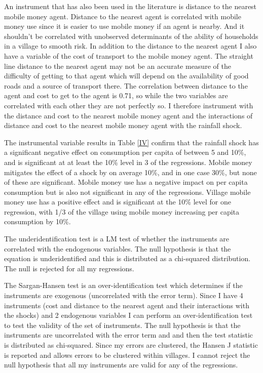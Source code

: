 An instrument that has also been used in the literature is distance to the nearest mobile money agent. Distance to the nearest agent is correlated with mobile money use since it is easier to use mobile money if an agent is nearby. And it shouldn't be correlated with unobserved determinants of the ability of households in a village to smooth risk. In addition to the distance to the nearest agent I also have a variable of the cost of transport to the mobile money agent. The straight line distance to the nearest agent may not be an accurate measure of the difficulty of getting to that agent which will depend on the availability of good roads and a source of transport there. The correlation between distance to the agent and cost to get to the agent is 0.71, so while the two variables are correlated with each other they are not perfectly so. I therefore instrument with the distance and cost to the nearest mobile money agent and the interactions of distance and cost to the nearest mobile money agent with the rainfall shock. 



The instrumental variable results in Table \ref{IV} confirm that the rainfall shock has a significant negative effect on consumption per capita of between 5 and 10\%, and is significant at at least the 10\% level in 3 of the regressions. Mobile money mitigates the effect of a shock by on average 10\%, and in one case 30\%, but none of these are significant. Mobile money use has a negative impact on per capita consumption  but is also not significant in any of the regressions. Village mobile money use has a positive effect and is significant at the 10\% level for one regression, with 1/3 of the village using mobile money increasing per capita consumption by 10\%. 


The underidentification test is a LM test of whether the instruments are correlated with the endogenous variables. The null hypothesis is that the equation is underidentified and this is distributed as a chi-squared distribution. The null is rejected for all my regressions. 

The Sargan-Hansen test is an over-identification test which determines if the instruments are exogenous (uncorrelated with the error term). Since I have 4 instruments (cost and distance to the nearest agent and their interactions with the shocks) and 2 endogenous variables I can perform an over-identification test to test the validity of the set of instruments. The null hypothesis is that the instruments are uncorrelated with the error term and and then the test statistic is distributed as chi-squared. Since my errors are clustered, the Hansen J statistic is reported and allows errors to be clustered within villages. I cannot reject the null hypothesis that all my instruments are valid for any of the regressions. 

